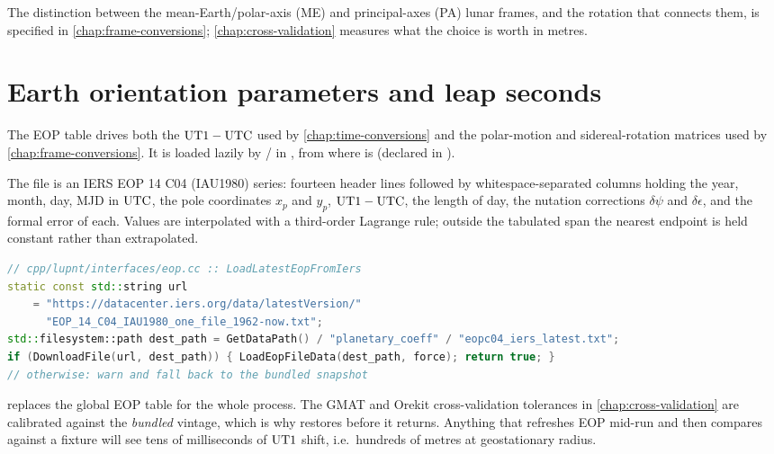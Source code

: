 The distinction between the mean-Earth/polar-axis (ME) and principal-axes (PA)
lunar frames, and the rotation that connects them, is specified in
\cref{chap:frame-conversions}; \cref{chap:cross-validation} measures what the
choice is worth in metres.

\section{Earth orientation parameters and leap seconds}
\label{sec:sp3-eop}

The EOP table drives both the $\mathrm{UT1}-\mathrm{UTC}$ used by
\cref{chap:time-conversions} and the polar-motion and sidereal-rotation
matrices used by \cref{chap:frame-conversions}. It is loaded lazily by
 /  in
, from
 where  is
 (declared in ).

The file is an IERS EOP 14 C04 (IAU1980) series: fourteen header lines
followed by whitespace-separated columns holding the year, month, day, MJD in
$\mathrm{UTC}$, the pole coordinates $x_p$ and $y_p$, $\mathrm{UT1}-\mathrm{UTC}$, the length of day,
the nutation corrections $\delta\psi$ and $\delta\epsilon$, and the formal
error of each. Values are interpolated with a third-order Lagrange rule;
outside the tabulated span the nearest endpoint is held constant rather than
extrapolated.

\begin{lstlisting}[language=cpp, caption={On-demand refresh from the IERS data centre.}, label={lst:sp3-eop}]
// cpp/lupnt/interfaces/eop.cc :: LoadLatestEopFromIers
static const std::string url
    = "https://datacenter.iers.org/data/latestVersion/"
      "EOP_14_C04_IAU1980_one_file_1962-now.txt";
std::filesystem::path dest_path = GetDataPath() / "planetary_coeff" / "eopc04_iers_latest.txt";
if (DownloadFile(url, dest_path)) { LoadEopFileData(dest_path, force); return true; }
// otherwise: warn and fall back to the bundled snapshot
\end{lstlisting}

\begin{lupntwarning}
 replaces the global EOP table for the whole
process. The GMAT and Orekit cross-validation tolerances in
\cref{chap:cross-validation} are calibrated against the \emph{bundled}
vintage, which is why  restores
 before it returns. Anything that refreshes
EOP mid-run and then compares against a fixture will see tens of milliseconds
of $\mathrm{UT1}$ shift, i.e.\ hundreds of metres at geostationary radius.
\end{lupntwarning}


